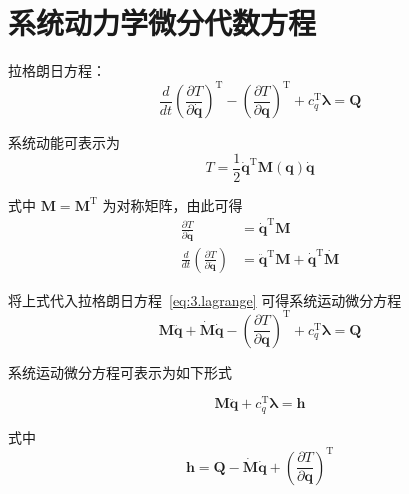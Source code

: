\section{系统动力学微分代数方程}

拉格朗日方程：
\begin{equation}\label{eq:3.lagrange}
\frac{d}{dt}\left(\frac{\partial T}{\partial \dot{\boldsymbol{q}}}\right)^{\mathrm{T}} - \left(\frac{\partial T}{\partial \boldsymbol{q}}\right)^{\mathrm{T}} + c_q^{\mathrm{T}} \boldsymbol{\lambda} = \boldsymbol{Q}
\end{equation}

系统动能可表示为
\begin{equation}\label{eq:3.kinetic}
T = \frac{1}{2} \dot{\boldsymbol{q}}^{\mathrm{T}} \boldsymbol{M}(\boldsymbol{q}) \dot{\boldsymbol{q}}
\end{equation}

式中 $\boldsymbol{M} = \boldsymbol{M}^{\mathrm{T}}$ 为对称矩阵，由此可得
\begin{align}
\frac{\partial T}{\partial \dot{\boldsymbol{q}}} &= \dot{\boldsymbol{q}}^{\mathrm{T}} \boldsymbol{M} \\
\frac{d}{dt}\left(\frac{\partial T}{\partial \dot{\boldsymbol{q}}}\right) &= \ddot{\boldsymbol{q}}^{\mathrm{T}} \boldsymbol{M} + \dot{\boldsymbol{q}}^{\mathrm{T}} \dot{\boldsymbol{M}}
\end{align}

将上式代入拉格朗日方程~\eqref{eq:3.lagrange} 可得系统运动微分方程
\begin{equation}
\boldsymbol{M} \ddot{\boldsymbol{q}} + \dot{\boldsymbol{M}} \dot{\boldsymbol{q}} - \left(\frac{\partial T}{\partial \boldsymbol{q}}\right)^{\mathrm{T}} + c_q^{\mathrm{T}} \boldsymbol{\lambda} = \boldsymbol{Q}
\end{equation}

系统运动微分方程可表示为如下形式
\begin{myformula}
\begin{equation}\label{eq:3.dae_motion}
\boldsymbol{M} \ddot{\boldsymbol{q}} + c_q^{\mathrm{T}} \boldsymbol{\lambda} = \boldsymbol{h} \tag{I}
\end{equation}
\end{myformula}

式中
\begin{equation}\label{eq:3.h_def}
\boldsymbol{h} = \boldsymbol{Q} - \dot{\boldsymbol{M}} \dot{\boldsymbol{q}} + \left(\frac{\partial T}{\partial \boldsymbol{q}}\right)^{\mathrm{T}}
\end{equation}

